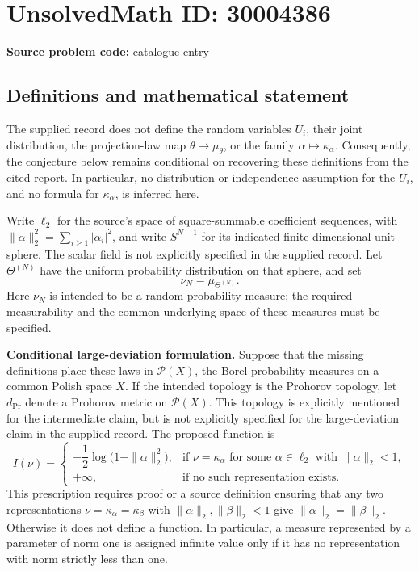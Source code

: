 \documentclass[11pt]{article}
\begin{document}
\section*{UnsolvedMath ID: 30004386}
\textbf{Source problem code:} catalogue entry
\subsection{Definitions and mathematical statement}
The supplied record does not define the random variables \(U_i\), their joint distribution, the projection-law map \(\theta\mapsto\mu_\theta\), or the family \(\alpha\mapsto\kappa_\alpha\). Consequently, the conjecture below remains conditional on recovering these definitions from the cited report. In particular, no distribution or independence assumption for the \(U_i\), and no formula for \(\kappa_\alpha\), is inferred here.

Write \(\ell_2\) for the source's space of square-summable coefficient sequences, with \(\|\alpha\|_2^2=\sum_{i\geq1}|\alpha_i|^2\), and write \(S^{N-1}\) for its indicated finite-dimensional unit sphere. The scalar field is not explicitly specified in the supplied record. Let \(\Theta^{(N)}\) have the uniform probability distribution on that sphere, and set
\[
\nu_N=\mu_{\Theta^{(N)}}.
\]
Here \(\nu_N\) is intended to be a random probability measure; the required measurability and the common underlying space of these measures must be specified.

\textbf{Conditional large-deviation formulation.} Suppose that the missing definitions place these laws in \(\mathcal P(X)\), the Borel probability measures on a common Polish space \(X\). If the intended topology is the Prohorov topology, let \(d_{\mathrm{Pr}}\) denote a Prohorov metric on \(\mathcal P(X)\). This topology is explicitly mentioned for the intermediate claim, but is not explicitly specified for the large-deviation claim in the supplied record. The proposed function is
\[
I(\nu)=
\begin{cases}
-\dfrac12\log\bigl(1-\|\alpha\|_2^2\bigr),
&\text{if }\nu=\kappa_\alpha\text{ for some }\alpha\in\ell_2\text{ with }\|\alpha\|_2<1,\\
+\infty,
&\text{if no such representation exists.}
\end{cases}
\]
This prescription requires proof or a source definition ensuring that any two representations \(\nu=\kappa_\alpha=\kappa_\beta\) with \(\|\alpha\|_2,\|\beta\|_2<1\) give \(\|\alpha\|_2=\|\beta\|_2\). Otherwise it does not define a function. In particular, a measure represented by a parameter of norm one is assigned infinite value only if it has no representation with norm strictly less than one.
\end{document}
